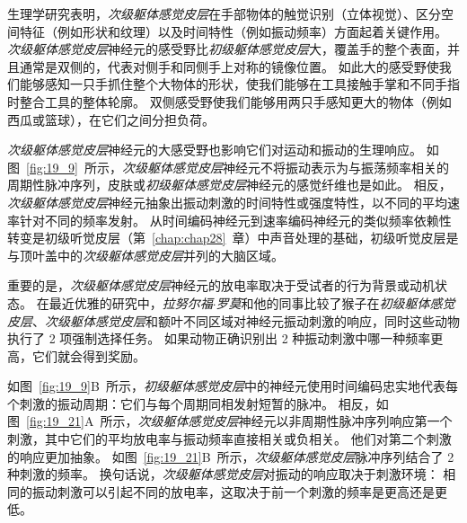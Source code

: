 生理学研究表明，\textit{次级躯体感觉皮层}在手部物体的触觉识别（立体视觉）、区分空间特征（例如形状和纹理）以及时间特性（例如振动频率）方面起着关键作用。
\textit{次级躯体感觉皮层}神经元的感受野比\textit{初级躯体感觉皮层}大，覆盖手的整个表面，并且通常是双侧的，代表对侧手和同侧手上对称的镜像位置。
如此大的感受野使我们能够感知一只手抓住整个大物体的形状，使我们能够在工具接触手掌和不同手指时整合工具的整体轮廓。
双侧感受野使我们能够用两只手感知更大的物体（例如西瓜或篮球），在它们之间分担负荷。


\textit{次级躯体感觉皮层}神经元的大感受野也影响它们对运动和振动的生理响应。
如图~\ref{fig:19_9}~所示，\textit{次级躯体感觉皮层}神经元不将振动表示为与振荡频率相关的周期性脉冲序列，皮肤或\textit{初级躯体感觉皮层}神经元的感觉纤维也是如此。
相反，\textit{次级躯体感觉皮层}神经元抽象出振动刺激的时间特性或强度特性，以不同的平均速率针对不同的频率发射。
从时间编码神经元到速率编码神经元的类似频率依赖性转变是初级听觉皮层（第~\ref{chap:chap28}~章）中声音处理的基础，初级听觉皮层是与顶叶盖中的\textit{次级躯体感觉皮层}并列的大脑区域。


重要的是，\textit{次级躯体感觉皮层}神经元的放电率取决于受试者的行为背景或动机状态。
在最近优雅的研究中，\textit{拉努尔福$\cdot$罗莫}和他的同事比较了猴子在\textit{初级躯体感觉皮层}、\textit{次级躯体感觉皮层}和额叶不同区域对神经元振动刺激的响应，同时这些动物执行了 2 项强制选择任务。
如果动物正确识别出 2 种振动刺激中哪一种频率更高，它们就会得到奖励。


如图~\ref{fig:19_9}B~所示，\textit{初级躯体感觉皮层}中的神经元使用时间编码忠实地代表每个刺激的振动周期：它们与每个周期同相发射短暂的脉冲。
相反，如图~\ref{fig:19_21}A~所示，\textit{次级躯体感觉皮层}神经元以非周期性脉冲序列响应第一个刺激，其中它们的平均放电率与振动频率直接相关或负相关。
他们对第二个刺激的响应更加抽象。
如图~\ref{fig:19_21}B~所示，\textit{次级躯体感觉皮层}脉冲序列结合了 2 种刺激的频率。
换句话说，\textit{次级躯体感觉皮层}对振动的响应取决于刺激环境：
相同的振动刺激可以引起不同的放电率，这取决于前一个刺激的频率是更高还是更低。


